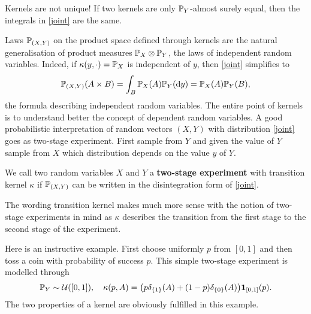 	\marginpar{\textcolor{red}{Lecture 3}}
\begin{lwarnhinweis}
	Kernels are not unique! If two kernels are only $\P_Y$-almost surely equal, then the integrals in \eqref{joint} are the same. 
\end{lwarnhinweis}
Laws $\P_{(X,Y)}$ on the product space defined through kernels are the natural generalisation of product measures $\P_X\otimes \P_Y$, the laws of independent random variables. Indeed, if $\kappa(y,\cdot)=\P_X$ is independent of $y$, then \eqref{joint} simplifies to 
		\begin{align*}
			\P_{(X,Y)}(A\times B)=\int_B \P_X(A)  \P_Y(\mathrm d y)=\P_X(A) \P_Y(B),
		\end{align*}	
	the formula describing independent random variables. The entire point of kernels is to understand better the concept of dependent random variables. A good probabilistic interpretation of random vectors $(X,Y)$ with distribution \eqref{joint} goes as two-stage experiment. First sample from $Y$ and given the value of $Y$ sample from $X$ which distribution depends on the value $y$ of $Y$.
	\begin{laussagewerkzeug}
	\begin{deff}
		We call two random variables $X$ and $Y$ a \textbf{two-stage experiment} with transition kernel $\kappa$ if $\P_{(X,Y)}$ can be written in the disintegration form of \eqref{joint}.
	\end{deff}
	\end{laussagewerkzeug}
		The wording transition kernel makes much more sense with the notion of two-stage experiments in mind as $\kappa$ describes the transition from the first stage to the second stage of the experiment.\smallskip
	
	Here is an instructive example. First choose uniformly $p$ from $[0,1]$ and then toss a coin with probability of success $p$. This simple two-stage experiment is modelled through
	\begin{align*}
		\P_Y\sim \mathcal U([0,1]),\quad \kappa(p,A )= \big(p\delta_{\{1\}}(A)+(1-p)\delta_{\{0\}}(A)\big) \mathbf 1_{[0,1]}(p).
	\end{align*}
	The two properties of a kernel are obviously fulfilled in this example.\smallskip

		

